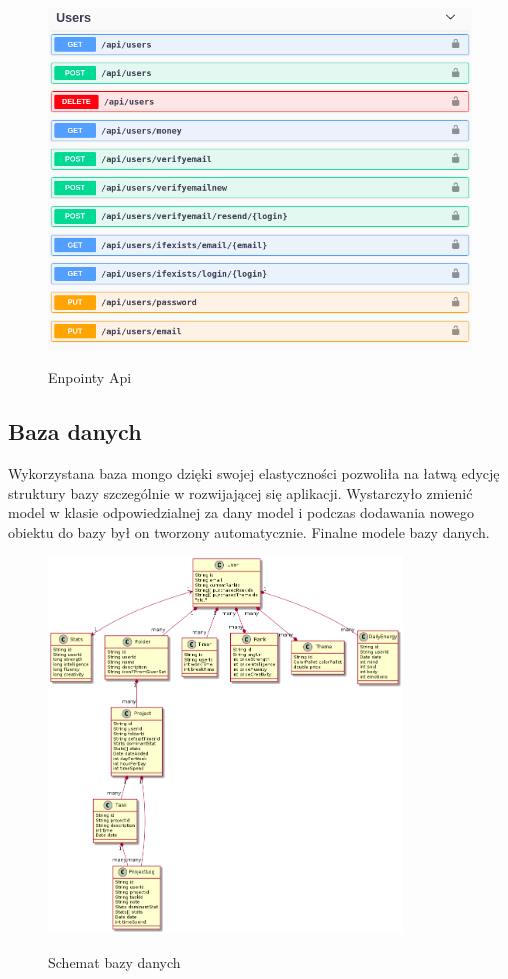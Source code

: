 \documentclass[a4paper,11pt]{report}
\begin{document}
\begin{figure}[H]
	\centering
	\includegraphics[scale=0.5]{implementacja/backend/users_api}\\
	\caption{Enpointy Api}
	\label{fig:users_api}
\end{figure}
\subsection{Baza danych}
Wykorzystana baza mongo dzięki swojej elastyczności pozwoliła na łatwą edycję struktury bazy szczególnie w rozwijającej się aplikacji.
Wystarczyło zmienić model w klasie odpowiedzialnej za dany model i podczas dodawania nowego obiektu do bazy był on tworzony automatycznie.
Finalne modele bazy danych.
\begin{figure}[h]
	\centering
	\includegraphics[width=\textwidth, height=10cm]{gamitude_database_model}\\
	\caption{Schemat bazy danych}
	\label{fig:db}
\end{figure}
\end{document}
